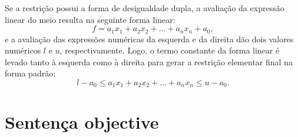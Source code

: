\documentclass[11pt, brazil]{report}
\begin{document}
Se a restrição possui a forma de desigualdade dupla, a avaliação da
expressão linear do meio resulta na seguinte forma linear:
$$f=a_1x_1+a_2x_2+\dots+a_nx_n+a_0,$$
e a avaliação das expressões numéricas da esquerda e da direita dão
dois valores numéricos $l$ e $u$, respectivamente. Logo,
o termo constante da forma linear é levado tanto à esquerda como
à direita para gerar a restrição elementar final na forma padrão:
$$l-a_0\leq a_1x_1+a_2x_2+\dots+a_nx_n\leq u-a_0.$$


%


\section{Sentença objective}

\noindent
{}
\end{document}
